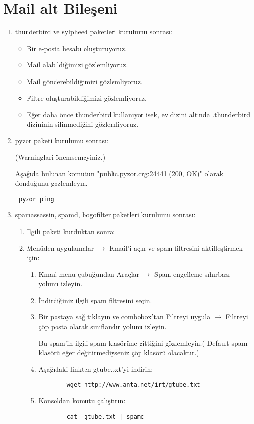 \documentclass[a4paper,10pt]{article}
\begin{document}
\section{Mail alt Bileşeni}
\begin{enumerate}
 \item thunderbird ve sylpheed paketleri kurulumu sonrası:
\begin{itemize}
\item Bir e-posta hesabı oluşturuyoruz.
\item Mail alabildiğimizi gözlemliyoruz.
\item Mail gönderebildiğimizi gözlemliyoruz.
\item Filtre oluşturabildiğimizi gözlemliyoruz.
\item Eğer daha önce thunderbird kullanıyor isek, ev dizini altında .thunderbird dizininin silinmediğini gözlemliyoruz.
\end{itemize}
\item pyzor paketi kurulumu sonrası:

(Warninglari önemsemeyiniz.)

Aşağıda bulunan komutun "public.pyzor.org:24441 (200, OK)" olarak döndüğünü gözlemleyin.
\begin{verbatim}
 pyzor ping
\end{verbatim}


 \item spamassassin, spamd, bogofilter paketleri kurulumu sonrası:
\begin{enumerate}
	\item İlgili paketi kurduktan sonra:
	\item Menüden uygulamalar $\rightarrow$ Kmail'i açın ve spam filtresini aktifleştirmek için:
		
	\begin{enumerate}
		\item Kmail menü çubuğundan Araçlar $\rightarrow$  Spam engelleme sihirbazı yolunu izleyin.
		\item İndirdiğiniz ilgili spam filtresini seçin.
		\item Bir postaya sağ tıklayın ve combobox'tan Filtreyi uygula $\rightarrow$ Filtreyi çöp posta olarak sınıflandır yolunu izleyin.

		Bu spam'in ilgili spam klasörüne gittiğini gözlemleyin.( Default spam klasörü eğer değitirmediyseniz çöp klasörü olacaktır.)

		\item Aşağıdaki linkten gtube.txt'yi indirin: 
		\begin{verbatim}
 		wget http://www.anta.net/irt/gtube.txt
		\end{verbatim}
		\item  Konsoldan komutu çalıştırın:
		\begin{verbatim}
 		cat  gtube.txt | spamc 
		\end{verbatim}
		

\end{enumerate}
\end{enumerate}
\end{enumerate}
\end{document}
